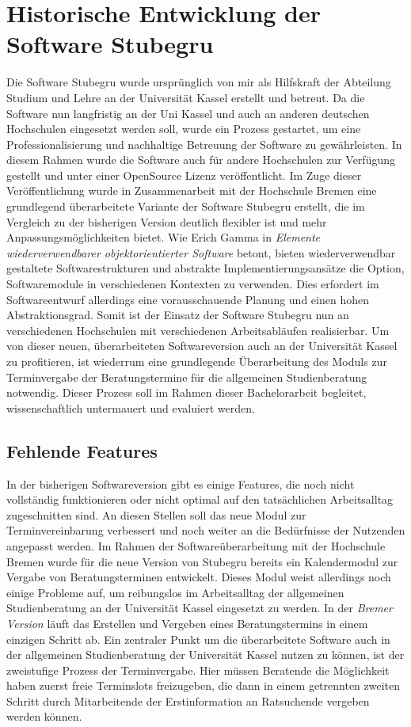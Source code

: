 \section{Historische Entwicklung der Software Stubegru}
Die Software Stubegru wurde ursprünglich von mir als Hilfskraft der Abteilung
Studium und Lehre an der Universität Kassel erstellt und betreut. Da die
Software nun langfristig an der Uni Kassel und auch an anderen deutschen
Hochschulen eingesetzt werden soll, wurde ein Prozess gestartet, um eine
Professionalisierung und nachhaltige Betreuung der Software zu gewährleisten.
In diesem Rahmen wurde die Software auch für andere Hochschulen zur Verfügung
gestellt und unter einer OpenSource Lizenz veröffentlicht. Im Zuge dieser
Veröffentlichung wurde in Zusammenarbeit mit der Hochschule Bremen eine
grundlegend überarbeitete Variante der Software Stubegru erstellt, die im
Vergleich zu der bisherigen Version deutlich flexibler ist und mehr
Anpassungsmöglichkeiten bietet. Wie Erich Gamma in \textit{Elemente
    wiederverwendbarer objektorientierter Software} betont, bieten wiederverwendbar
gestaltete Softwarestrukturen und abstrakte Implementierungsansätze die Option,
Softwaremodule in verschiedenen Kontexten zu verwenden. Dies erfordert im
Softwareentwurf allerdings eine vorausschauende Planung und einen hohen
Abstraktionsgrad.\cite{wiederverwSoftware} Somit ist der Einsatz der Software
Stubegru nun an verschiedenen Hochschulen mit verschiedenen Arbeitsabläufen
realisierbar. Um von dieser neuen, überarbeiteten Softwareversion auch an der
Universität Kassel zu profitieren, ist wiederrum eine grundlegende
Überarbeitung des Moduls zur Terminvergabe der Beratungstermine für die
allgemeinen Studienberatung notwendig. Dieser Prozess soll im Rahmen dieser
Bachelorarbeit begleitet, wissenschaftlich untermauert und evaluiert werden.

\subsection*{Fehlende Features}
In der bisherigen Softwareversion gibt es einige Features, die noch nicht
vollständig funktionieren oder nicht optimal auf den tatsächlichen
Arbeitsalltag zugeschnitten sind. An diesen Stellen soll das neue Modul zur
Terminvereinbarung verbessert und noch weiter an die Bedürfnisse der Nutzenden
angepasst werden. Im Rahmen der Softwareüberarbeitung mit der Hochschule Bremen
wurde für die neue Version von Stubegru bereits ein Kalendermodul zur Vergabe
von Beratungsterminen entwickelt. Dieses Modul weist allerdings noch einige
Probleme auf, um reibungslos im Arbeitsalltag der allgemeinen Studienberatung
an der Universität Kassel eingesetzt zu werden. In der \textit{Bremer Version} läuft
das Erstellen und Vergeben eines Beratungstermins in einem einzigen Schritt ab.
Ein zentraler Punkt um die überarbeitete Software auch in der allgemeinen
Studienberatung der Universität Kassel nutzen zu können, ist der zweistufige
Prozess der Terminvergabe. Hier müssen Beratende die Möglichkeit haben zuerst
freie Terminslots freizugeben, die dann in einem getrennten zweiten Schritt
durch Mitarbeitende der Erstinformation an Ratsuchende vergeben werden können.

